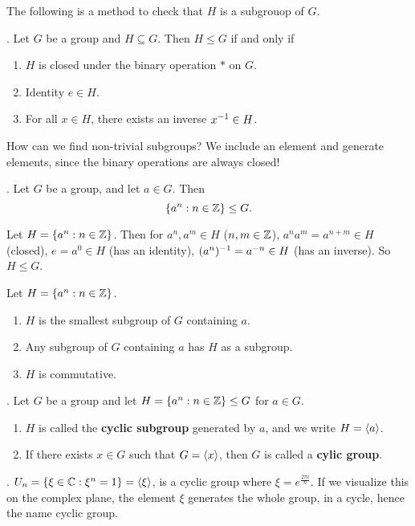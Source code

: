 The following is a method to check that \(H\) is a subgrouop of \(G\).

\thm. Let \(G\) be a group and \(H \subseteq G\). Then \(H \leq G\) if and only if
\begin{enumerate}
    \item \(H\) is closed under the binary operation \(*\) on \(G\).
    \item Identity \(e \in H\).
    \item For all \(x \in H\), there exists an inverse \(x^{-1} \in H\).
\end{enumerate}

How can we find non-trivial subgroups? We include an element and generate elements, since the binary operations are always closed!

\thm. Let \(G\) be a group, and let \(a \in G\). Then
\[
    \{a^n : n \in \mathbb{Z}\} \leq G.
\]

\pf Let \(H = \{a^n : n \in \mathbb{Z}\}\). Then for \(a^n, a^m \in H\) (\(n, m \in \mathbb{Z}\)), \(a^na^m = a^{n+m} \in H\) (closed), \(e = a^0 \in H\) (has an identity), \((a^n)^{-1} = a^{-n} \in H\) (has an inverse). So \(H \leq G\).

\rmk Let \(H = \{a^n : n \in \mathbb{Z}\}\).
\begin{enumerate}
    \item \(H\) is the smallest subgroup of \(G\) containing \(a\).
    \item Any subgroup of \(G\) containing \(a\) has \(H\) as a subgroup.
    \item \(H\) is commutative.
\end{enumerate}

.  Let \(G\) be a group and let \(H = \{a^n : n \in \mathbb{Z}\} \leq G\) for \(a \in G\).
\begin{enumerate}
    \item \(H\) is called the \textbf{cyclic subgroup} generated by \(a\), and we write \(H = \left\langle a \right\rangle\).
    \item If there exists \(x \in G\) such that \(G = \left\langle x \right\rangle\), then \(G\) is called a \textbf{cylic group}.
\end{enumerate}

\ex. \(U_n = \{\xi \in \mathbb{C} : \xi^n = 1\} = \left\langle \xi \right\rangle\), is a cyclic group where \(\xi = e^{\frac{2\pi i}{n}}\). If we visualize this on the complex plane, the element \(\xi\) generates the whole group, in a cycle, hence the name cyclic group.
\pagebreak
